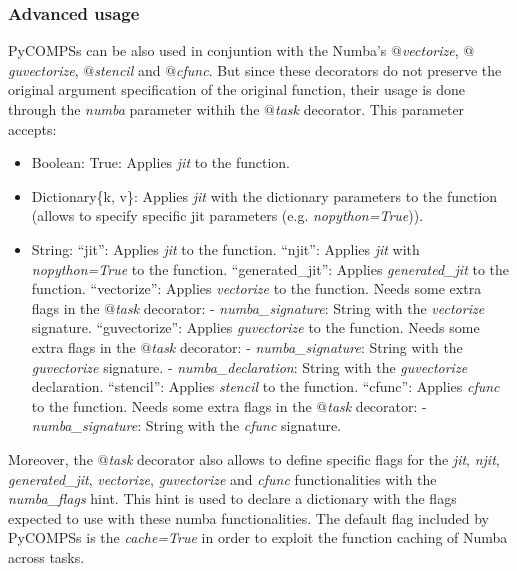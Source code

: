 \subsubsection{Advanced usage}

PyCOMPSs can be also used in conjuntion with the Numba's {\it $@$vectorize}, {\it $@$guvectorize}, {\it $@$stencil} and {\it $@$cfunc}. But since these decorators do not preserve
the original argument specification of the original function, their usage is done through the {\it numba} parameter withih the {\it $@$task} decorator.
This parameter accepts:
\begin{itemize}
 \item Boolean: True: Applies {\it jit} to the function.
 \item Dictionary\{k, v\}: Applies {\it jit} with the dictionary parameters to the function (allows to specify specific jit parameters (e.g. {\it nopython=True})).
 \item String:
   \subitem ``jit'': Applies {\it jit} to the function.
   \subitem ``njit'': Applies {\it jit} with {\it nopython=True} to the function.
   \subitem ``generated\_jit'': Applies {\it generated\_jit} to the function.
   \subitem ``vectorize'': Applies {\it vectorize} to the function.
     \subsubitem Needs some extra flags in the {\it $@$task} decorator:
     \subsubitem - {\it numba\_signature}: String with the {\it vectorize} signature.
   \subitem ``guvectorize'': Applies {\it guvectorize} to the function.
     \subsubitem Needs some extra flags in the {\it $@$task} decorator:
     \subsubitem - {\it numba\_signature}: String with the {\it guvectorize} signature.
     \subsubitem - {\it numba\_declaration}: String with the {\it guvectorize} declaration.
   \subitem ``stencil'': Applies {\it stencil} to the function.
   \subitem ``cfunc'': Applies {\it cfunc} to the function.
     \subsubitem Needs some extra flags in the {\it $@$task} decorator:
     \subsubitem - {\it numba\_signature}: String with the {\it cfunc} signature.
\end{itemize}
Moreover, the {\it $@$task} decorator also allows to define specific flags for the {\it jit}, {\it njit}, {\it generated\_jit}, {\it vectorize}, {\it guvectorize} and {\it cfunc} functionalities with the {\it numba\_flags} hint. This hint is used to declare a dictionary with the flags expected to use with these numba functionalities.
The default flag included by PyCOMPSs is the {\it cache=True} in order to exploit the function caching of Numba across tasks.

